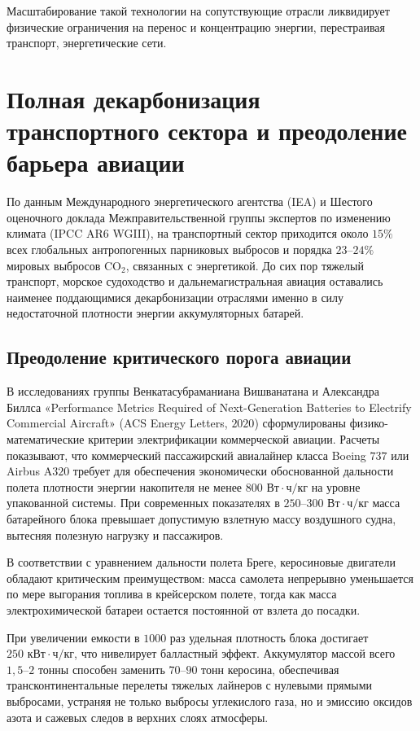 \documentclass[12pt,a4paper]{article}
\begin{document}
Масштабирование 
такой технологии на сопутствующие отрасли ликвидирует физические 
ограничения на перенос и концентрацию энергии, перестраивая 
транспорт, энергетические сети.

\section{Полная декарбонизация транспортного сектора и преодоление 
барьера авиации}

По данным Международного энергетического агентства (IEA) и 
Шестого оценочного доклада Межправительственной группы экспертов 
по изменению климата (IPCC AR6 WGIII), на транспортный сектор 
приходится около $15\%$ всех глобальных антропогенных парниковых 
выбросов и порядка $23\text{--}24\%$ мировых выбросов $\text{CO}_2$, 
связанных с энергетикой. До сих пор тяжелый транспорт, морское 
судоходство и дальнемагистральная авиация оставались наименее 
поддающимися декарбонизации отраслями 
именно в силу недостаточной плотности энергии аккумуляторных батарей.

\subsection{Преодоление критического порога авиации}

В исследованиях группы Венкатасубраманиана Вишванатана и Александра 
Биллса «Performance Metrics Required of Next-Generation Batteries to 
Electrify Commercial Aircraft» (ACS Energy Letters, $2020$) 
сформулированы физико-математические критерии электрификации 
коммерческой авиации. Расчеты показывают, что коммерческий 
пассажирский авиалайнер класса Boeing $737$ или Airbus A$320$ требует 
для обеспечения экономически обоснованной дальности полета плотности 
энергии накопителя не менее $800\text{ Вт}\cdot\text{ч/кг}$ на уровне 
упакованной системы. При современных показателях в 
$250\text{--}300\text{ Вт}\cdot\text{ч/кг}$ масса батарейного блока 
превышает допустимую взлетную массу воздушного судна, вытесняя 
полезную нагрузку и пассажиров.

В соответствии с уравнением дальности полета Бреге, керосиновые 
двигатели обладают критическим преимуществом: масса самолета 
непрерывно уменьшается по мере выгорания топлива в крейсерском 
полете, тогда как масса электрохимической батареи остается постоянной 
от взлета до посадки.

При увеличении емкости в $1000$ раз удельная 
плотность блока достигает $250\text{ кВт}\cdot\text{ч/кг}$, что 
нивелирует балластный эффект. Аккумулятор массой всего 
$1{,}5\text{--}2\text{ тонны}$ способен заменить 
$70\text{--}90\text{ тонн}$ керосина, обеспечивая 
трансконтинентальные перелеты тяжелых лайнеров с нулевыми 
прямыми выбросами, устраняя не только выбросы углекислого газа, 
но и эмиссию оксидов азота и сажевых следов в верхних слоях атмосферы.
\end{document}

